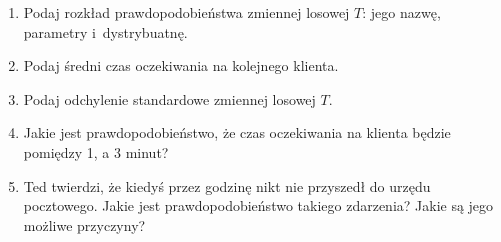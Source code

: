\documentclass[twoside]{mwart}
\newcommand{\ans}[1]{}
\newcommand{\ans}[1]{\par\emph{Odpowiedź:} #1}
\begin{document}
\begin{enumerate}
\begin{enumerate}
\item Podaj rozkład prawdopodobieństwa zmiennej losowej $T$: jego nazwę, parametry i~dystrybuatnę.
\ans
{
Rozkład wykładniczy
\begin{gather*}
F(x) = \begin{cases} 1-e^{-\lambda x} & x>0 \\ 0 & \text{wpp} \end{cases} \\
P(T<2)=F(2)=\frac{48}{50} \\
1-e^{-2\lambda}=\frac{24}{25} \\
e^{-2\lambda}=\frac{1}{25} \\ 
-2\lambda = \ln \frac{1}{25} = -2 \ln 5 \\
\lambda = \ln 5 \approx 1{,}609
\end{gather*}
}
\item Podaj średni czas oczekiwania na kolejnego klienta.
\ans{ $ET = \frac{1}{\lambda} = \frac{1}{\ln 5} \approx 0{,}621$ }
\item Podaj odchylenie standardowe zmiennej losowej $T$.
\ans{$DT=ET=\frac{1}{\lambda} = \frac{1}{\ln 5} \approx 0{,}621$ }
\item Jakie jest prawdopodobieństwo, że czas oczekiwania na klienta będzie pomiędzy 1, a 3 minut?
\ans{$P(1\leq T\leq 3) = F(3)-F(1) = 1-e^{-3\lambda}-(1-e^{-\lambda}) = e^{-\lambda}-e^{-3\lambda}=5^{-1}-5^{-3}=\frac{5^2-1}{5^3}=\frac{24}{125}=0{,}192$}
\item Ted twierdzi, że kiedyś przez godzinę nikt nie przyszedł do urzędu pocztowego. Jakie jest prawdopodobieństwo takiego zdarzenia? Jakie są jego możliwe przyczyny?
\ans{$P(T>60)=1-F(60)=1-(1-e^{-60\lambda}) = 5^{-60} \approx 0$}
\end{enumerate}


\end{enumerate}
\end{document}
